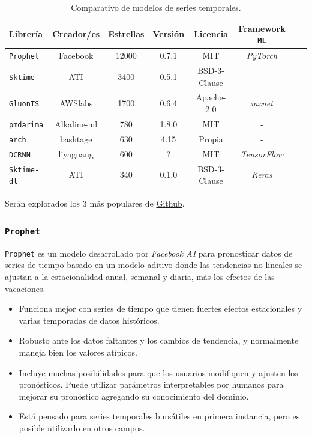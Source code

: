 \documentclass[a4paper,12pt]{article}
\begin{document}
\begin{table}[H]
	\centering
	\begin{adjustwidth}{-0.5cm}{}
		\begin{tabular}{l|ccccccc}
			Librería          & Creador/es  & Estrellas & Versión & Licencia     & Framework \texttt{ML} \\ \hline
			\texttt{Prophet}   & Facebook    & 12000     & 0.7.1    & MIT          & \textit{PyTorch}      \\
			\texttt{Sktime}    & ATI         & 3400      & 0.5.1    & BSD-3-Clause & -                     \\
			\texttt{GluonTS}   & AWSlabs     & 1700      & 0.6.4    & Apache-2.0   & \textit{mxnet}        \\
			\texttt{pmdarima}  & Alkaline-ml & 780       & 1.8.0    & MIT          & -                     \\
			\texttt{arch}      & bashtage    & 630       & 4.15     & Propia       & -                     \\
			\texttt{DCRNN}     & liyaguang   & 600       & ?        & MIT          & \textit{TensorFlow}   \\
			\texttt{Sktime-dl} & ATI         & 340       & 0.1.0    & BSD-3-Clause & \textit{Keras}        
		\end{tabular}
	\end{adjustwidth}
	\caption{Comparativo de modelos de series temporales.}
	\label{tab:ts-models}
\end{table}

Serán explorados los 3 más populares de \href{http://www.github.com}{Github}.

\subsubsection{\texttt{Prophet}}
\texttt{Prophet} es un modelo desarrollado por \textit{Facebook AI} para pronosticar datos de series de tiempo basado en un modelo aditivo donde las tendencias no lineales se ajustan a la estacionalidad anual, semanal y diaria, más los efectos de las vacaciones. \citep{prophet}

\begin{itemize}[noitemsep, topsep=2pt]
	\item Funciona mejor con series de tiempo que tienen fuertes efectos estacionales y varias temporadas de datos históricos.
	\item Robusto ante los datos faltantes y los cambios de tendencia, y normalmente maneja bien los valores atípicos.
	\item Incluye muchas posibilidades para que los usuarios modifiquen y ajusten los pronósticos. Puede utilizar parámetros interpretables por humanos para mejorar su pronóstico agregando su conocimiento del dominio.
	\item Está pensado para series temporales bursátiles en primera instancia, pero es posible utilizarlo en otros campos.
\end{itemize}
\end{document}
